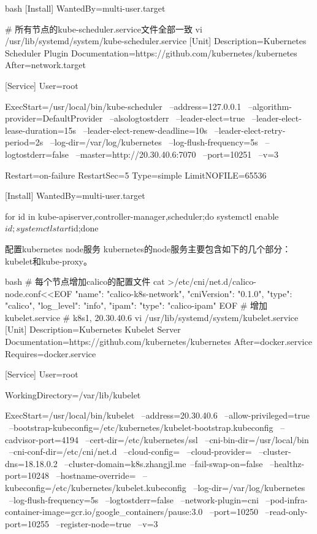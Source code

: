 \begin{outline}[enumerate]
\begin{code-in-enumerate}{bash}
[Install]
WantedBy=multi-user.target

# 所有节点的kube-scheduler.service文件全部一致
vi /usr/lib/systemd/system/kube-scheduler.service
[Unit]
Description=Kubernetes Scheduler Plugin
Documentation=https://github.com/kubernetes/kubernetes
After=network.target

[Service]
User=root

ExecStart=/usr/local/bin/kube-scheduler \
    --address=127.0.0.1 \
    --algorithm-provider=DefaultProvider \
    --alsologtostderr \
    --leader-elect=true \
    --leader-elect-lease-duration=15s \
    --leader-elect-renew-deadline=10s \
    --leader-elect-retry-period=2s \
    --log-dir=/var/log/kubernetes \
    --log-flush-frequency=5s \
    --logtostderr=false \
    --master=http://20.30.40.6:7070 \
    --port=10251 \
    --v=3

Restart=on-failure
RestartSec=5
Type=simple
LimitNOFILE=65536

[Install]
WantedBy=multi-user.target

for id in kube-{apiserver,controller-manager,scheduler};do systemctl enable $id;systemctl start $id;done
\end{code-in-enumerate}

  \1 配置kubernetes node服务
kubernetes的node服务主要包含如下的几个部分：kubelet和kube-proxy。
\begin{code-in-enumerate}{bash}
# 每个节点增加calico的配置文件
cat >/etc/cni/net.d/calico-node.conf<<EOF
{
    "name": "calico-k8s-network",
    "cniVersion": "0.1.0",
    "type": "calico",
    "log_level": "info",
    "ipam": {
        "type": "calico-ipam"
    }
}
EOF
# 增加kubelet.service
# k8s1, 20.30.40.6
vi /usr/lib/systemd/system/kubelet.service
[Unit]
Description=Kubernetes Kubelet Server
Documentation=https://github.com/kubernetes/kubernetes
After=docker.service
Requires=docker.service

[Service]
User=root

WorkingDirectory=/var/lib/kubelet

ExecStart=/usr/local/bin/kubelet \
    --address=20.30.40.6 \
    --allow-privileged=true \
    --bootstrap-kubeconfig=/etc/kubernetes/kubelet-bootstrap.kubeconfig \
    --cadvisor-port=4194 \
    --cert-dir=/etc/kubernetes/ssl \
    --cni-bin-dir=/usr/local/bin \
    --cni-conf-dir=/etc/cni/net.d \
    --cloud-config= \
    --cloud-provider= \
    --cluster-dns=18.18.0.2 \
    --cluster-domain=k8s.zhangjl.me\
    --fail-swap-on=false \
    --healthz-port=10248 \
    --hostname-override= \
    --kubeconfig=/etc/kubernetes/kubelet.kubeconfig \
    --log-dir=/var/log/kubernetes \
    --log-flush-frequency=5s \
    --logtostderr=false \
    --network-plugin=cni \
    --pod-infra-container-image=gcr.io/google_containers/pause:3.0 \
    --port=10250 \
    --read-only-port=10255 \
    --register-node=true \
    --v=3


\end{code-in-enumerate}
\end{outline}

